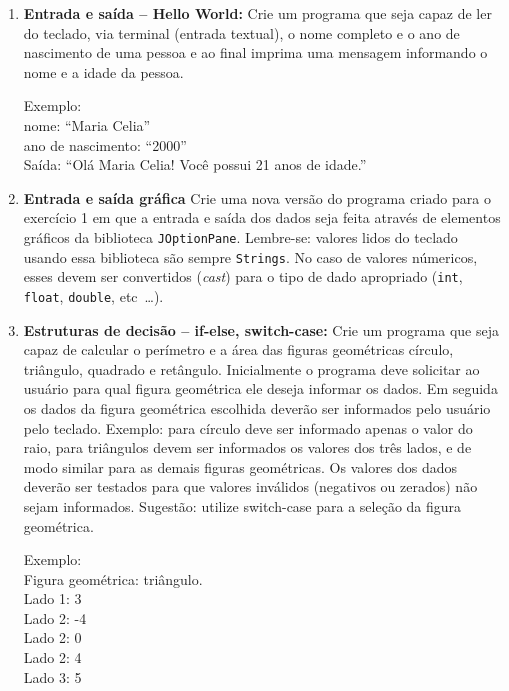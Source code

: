 \documentclass[a4paper, 12pt]{letter}
\begin{document}
\begin{enumerate}

  \item \textbf{Entrada e saída -- Hello World:} Crie um programa que seja capaz
    de ler do teclado, via terminal (entrada textual), o nome completo e o ano
    de nascimento de uma pessoa e ao final imprima uma mensagem informando o
    nome e a idade da pessoa. 

    Exemplo: \\
    nome: ``Maria Celia'' \\
    ano de nascimento: ``2000'' \\
    Saída: ``Olá Maria Celia!  Você possui 21 anos de idade.''

  \item \textbf{Entrada e saída gráfica} Crie uma nova versão do programa criado
    para o exercício 1 em que a entrada e saída dos dados seja feita através de
    elementos gráficos da biblioteca \texttt{JOptionPane}. Lembre-se: valores
    lidos do teclado usando essa biblioteca são sempre \texttt{Strings}. No caso
    de valores númericos, esses devem ser convertidos (\textit{cast}) para o
    tipo de dado apropriado (\texttt{int}, \texttt{float}, \texttt{double},
    etc~\ldots).

  \item \textbf{Estruturas de decisão -- if-else, switch-case:} Crie um programa
    que seja capaz de calcular o perímetro e a área das figuras geométricas
    círculo, triângulo, quadrado e retângulo. Inicialmente o programa deve
    solicitar ao usuário para qual figura geométrica ele deseja informar os
    dados. Em seguida os dados da figura geométrica escolhida deverão ser
    informados pelo usuário pelo teclado. Exemplo: para círculo deve ser
    informado apenas o valor do raio, para triângulos devem ser informados os
    valores dos três lados, e de modo similar para as demais figuras
    geométricas. Os valores dos dados deverão ser testados para que valores
    inválidos (negativos ou zerados) não sejam informados. Sugestão: utilize
    switch-case para a seleção da figura geométrica.

    Exemplo:   \\
    Figura geométrica: triângulo. \\
    Lado 1: 3  \\
    Lado 2: -4 \\
    Lado 2: 0  \\
    Lado 2: 4  \\
    Lado 3: 5  \\


\end{enumerate}
\end{document}
